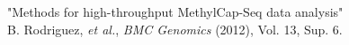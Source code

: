 "Methods for high-throughput MethylCap-Seq data analysis" \\
\small{B. Rodriguez, \textit{et al.}, \textit{BMC Genomics} (2012), Vol. 13, Sup. 6.} \\
